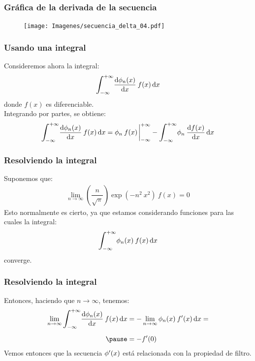 \documentclass[12pt]{beamer}
\begin{document}
\begin{frame}
\frametitle{Gráfica de la derivada de la secuencia}
\begin{figure}[H]
    \centering
    \texttt{[image: Imagenes/secuencia\_delta\_04.pdf]}
    \label{fig:fig_figura_delta_04}
\end{figure}
\end{frame}

\begin{frame}
\frametitle{Usando una integral}
Consideremos ahora la integral:
\begin{align*}
\scaleint{6ex}_{\bs -\infty}^{+\infty} \dv{\phi_{n}(x)}{x} \: f (x) \dd{x}
\end{align*}
donde $f (x)$ es diferenciable.
\\
\bigskip
\pause
Integrando por partes, se obtiene:
\pause
\begin{align*}
\scaleint{6ex}_{\bs -\infty}^{+\infty} \dv{\phi_{n}(x)}{x} \: f (x) \dd{x} = \phi_{n} \: f (x) \eval_{-\infty}^{+\infty} - \scaleint{6ex}_{\bs -\infty}^{+\infty} \phi_{n} \: \dv{f (x)}{x} \dd{x}
\end{align*}
\end{frame}

\begin{frame}
\frametitle{Resolviendo la integral}
Suponemos que:
\pause
\begin{align*}
\lim_{n \to \infty} \left( \dfrac{n}{\sqrt{\pi}} \right) \exp(-n^{2} \: x^{2}) \: f (x) = 0
\end{align*}
\pause
Esto normalmente es cierto, ya que estamos considerando funciones para las cuales la integral:
\pause
\begin{align*}
\scaleint{6ex}_{\bs -\infty}^{+\infty} \phi_{n}(x) \: f (x) \dd{x} 
\end{align*}
converge.
\end{frame}

\begin{frame}
\frametitle{Resolviendo la integral}
Entonces, haciendo que $n \to \infty$, tenemos:
\pause
\begin{eqnarray*}
\begin{aligned}
\lim_{n \to \infty} \scaleint{6ex}_{\bs -\infty}^{+\infty} \dv{\phi_{n}(x)}{x} \: f (x) \dd{x} &= - \lim_{n \to \infty} \phi_{n}(x) \: \pderivada{f} (x) \dd{x} =  \\[0.5em] \pause
&= - \pderivada{f} (0)
\end{aligned}
\end{eqnarray*}
\pause
Vemos entonces que la secuencia ${\phi}^{\prime} (x)$ está relacionada con la propiedad de filtro.
\end{frame}
\end{document}
